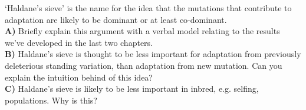 \begin{question}
`Haldane's sieve' is the name for the idea that the mutations that contribute to adaptation are likely to be dominant or at least co-dominant. \\
{\bf A)} Briefly explain this argument with a verbal model relating to the
results we’ve developed in the last two chapters. \\
{\bf B)} Haldane’s sieve is thought to be less important for adaptation from previously deleterious standing variation, than adaptation from new mutation. Can you explain the intuition behind of this idea?\\
{\bf C)} Haldane’s sieve is likely to be less important in inbred,
e.g. selfing, populations. Why is this? \\

\end{question}


